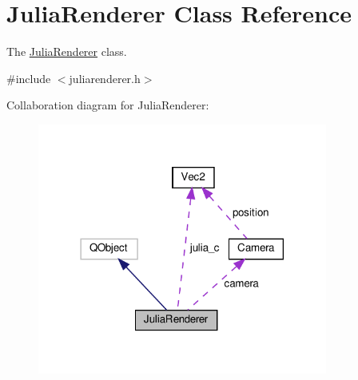 \hypertarget{classJuliaRenderer}{}\section{Julia\+Renderer Class Reference}
\label{classJuliaRenderer}


The \hyperlink{classJuliaRenderer}{Julia\+Renderer} class.  




{\ttfamily \#include $<$juliarenderer.\+h$>$}



Collaboration diagram for Julia\+Renderer\+:\nopagebreak
\begin{figure}[H]
\begin{center}
\leavevmode
\includegraphics[width=270pt]{classJuliaRenderer__coll__graph}
\end{center}
\end{figure}
